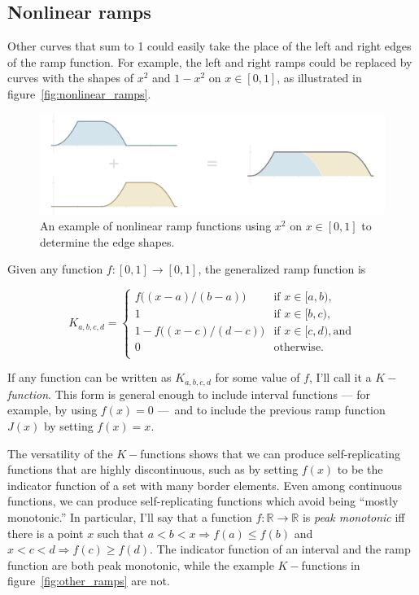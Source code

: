 \documentclass[]{article}
\begin{document}
\subsection{Nonlinear ramps}\label{sec:nonlinearux5framps}

Other curves that sum to 1 could easily take the place of the left and
right edges of the ramp function. For example, the left and right ramps
could be replaced by curves with the shapes of \(x^2\) and \(1-x^2\) on
\(x\in [0, 1]\), as illustrated in figure~\ref{fig:nonlinear_ramps}.

\begin{figure}[htbp]
\centering
\includegraphics{images/pdfs/nonlinear_ramps2.pdf}
\caption{\label{fig:nonlinear_ramps}An example of nonlinear ramp
functions using \(x^2\) on \(x\in [0, 1]\) to determine the edge
shapes.}\label{fig:nonlinearux5framps}
\end{figure}

Given any function \(f:[0,1]\to [0,1]\), the generalized ramp function
is

\[ K_{a,b,c,d} = \begin{cases}
f\big((x - a) / (b - a)\big) & \text{if } x \in [a, b), \\
1 & \text{if } x \in [b, c), \\
1 - f\big((x - c) / (d - c)\big) & \text{if } x \in [c, d), \text{and} \\
0 & \text{otherwise.} \\
\end{cases}\]

If any function can be written as \(K_{a,b,c,d}\) for some value of
\(f\), I'll call it a \(K-\)\emph{function}. This form is general enough
to include interval functions --- for example, by using \(f(x) = 0\)
---~and to include the previous ramp function \(J(x)\) by setting
\(f(x)=x\).

The versatility of the \(K-\)functions shows that we can produce
self-replicating functions that are highly discontinuous, such as by
setting \(f(x)\) to be the indicator function of a set with many border
elements. Even among continuous functions, we can produce
self-replicating functions which avoid being ``mostly monotonic.'' In
particular, I'll say that a function \(f:\mathbb{R}\to\mathbb{R}\) is
\emph{peak monotonic} iff there is a point \(x\) such that
\(a < b < x \Rightarrow f(a) \le f(b)\) and
\(x < c < d \Rightarrow f(c) \ge f(d)\). The indicator function of an
interval and the ramp function are both peak monotonic, while the
example \(K-\)functions in figure~\ref{fig:other_ramps} are not.
\end{document}
